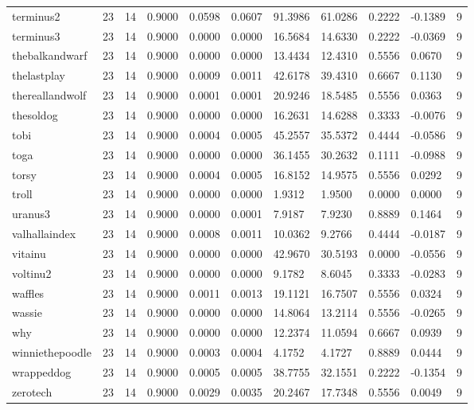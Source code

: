 \begin{table}[htbp]
\begin{tabular}{lllllllllll}
terminus2 & 23 & 14 & 0.9000 & 0.0598 & 0.0607 & 91.3986 & 61.0286 & 0.2222 & -0.1389 & 9 \\
terminus3 & 23 & 14 & 0.9000 & 0.0000 & 0.0000 & 16.5684 & 14.6330 & 0.2222 & -0.0369 & 9 \\
thebalkandwarf & 23 & 14 & 0.9000 & 0.0000 & 0.0000 & 13.4434 & 12.4310 & 0.5556 & 0.0670 & 9 \\
thelastplay & 23 & 14 & 0.9000 & 0.0009 & 0.0011 & 42.6178 & 39.4310 & 0.6667 & 0.1130 & 9 \\
thereallandwolf & 23 & 14 & 0.9000 & 0.0001 & 0.0001 & 20.9246 & 18.5485 & 0.5556 & 0.0363 & 9 \\
thesoldog & 23 & 14 & 0.9000 & 0.0000 & 0.0000 & 16.2631 & 14.6288 & 0.3333 & -0.0076 & 9 \\
tobi & 23 & 14 & 0.9000 & 0.0004 & 0.0005 & 45.2557 & 35.5372 & 0.4444 & -0.0586 & 9 \\
toga & 23 & 14 & 0.9000 & 0.0000 & 0.0000 & 36.1455 & 30.2632 & 0.1111 & -0.0988 & 9 \\
torsy & 23 & 14 & 0.9000 & 0.0004 & 0.0005 & 16.8152 & 14.9575 & 0.5556 & 0.0292 & 9 \\
troll & 23 & 14 & 0.9000 & 0.0000 & 0.0000 & 1.9312 & 1.9500 & 0.0000 & 0.0000 & 9 \\
uranus3 & 23 & 14 & 0.9000 & 0.0000 & 0.0001 & 7.9187 & 7.9230 & 0.8889 & 0.1464 & 9 \\
valhallaindex & 23 & 14 & 0.9000 & 0.0008 & 0.0011 & 10.0362 & 9.2766 & 0.4444 & -0.0187 & 9 \\
vitainu & 23 & 14 & 0.9000 & 0.0000 & 0.0000 & 42.9670 & 30.5193 & 0.0000 & -0.0556 & 9 \\
voltinu2 & 23 & 14 & 0.9000 & 0.0000 & 0.0000 & 9.1782 & 8.6045 & 0.3333 & -0.0283 & 9 \\
waffles & 23 & 14 & 0.9000 & 0.0011 & 0.0013 & 19.1121 & 16.7507 & 0.5556 & 0.0324 & 9 \\
wassie & 23 & 14 & 0.9000 & 0.0000 & 0.0000 & 14.8064 & 13.2114 & 0.5556 & -0.0265 & 9 \\
why & 23 & 14 & 0.9000 & 0.0000 & 0.0000 & 12.2374 & 11.0594 & 0.6667 & 0.0939 & 9 \\
winniethepoodle & 23 & 14 & 0.9000 & 0.0003 & 0.0004 & 4.1752 & 4.1727 & 0.8889 & 0.0444 & 9 \\
wrappeddog & 23 & 14 & 0.9000 & 0.0005 & 0.0005 & 38.7755 & 32.1551 & 0.2222 & -0.1354 & 9 \\
zerotech & 23 & 14 & 0.9000 & 0.0029 & 0.0035 & 20.2467 & 17.7348 & 0.5556 & 0.0049 & 9 \\

\end{tabular}
\end{table}

